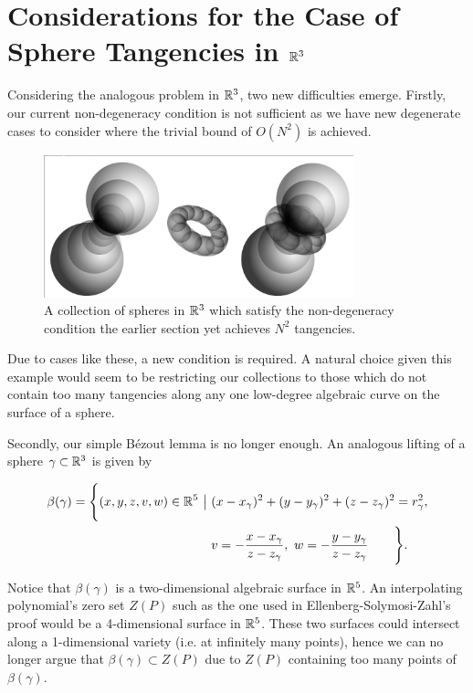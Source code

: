 \section[The Case of Sphere Tangencies in $\RR^{3}$]{Considerations for the Case of Sphere Tangencies in $\RR^{3}$}
Considering the analogous problem in $\RR^{3}$, two new difficulties emerge. 
Firstly, our current non-degeneracy condition is not sufficient as we have new degenerate cases to consider where the trivial bound of $O(N^2)$ is achieved. 
\begin{example}
    \begin{figure}[h]
        \centering 
        \includegraphics[width=0.8\textwidth]{images/degenr3.png}
        \caption{A collection of spheres in $\mathbb R^3$ which satisfy the non-degeneracy condition the earlier section yet achieves $N^2$ tangencies.}
        \end{figure}
\end{example}
Due to cases like these, a new condition is required. A natural choice given this example would seem to be restricting our collections to those which do not contain too many tangencies along any one low-degree algebraic curve on the surface of a sphere. 

Secondly, our simple Bézout lemma is no longer enough. An analogous lifting of a sphere $\gamma \subset \mathbb R^3$ is given by

\begin{align*}
    \beta(\gamma) = \Biggl \{ (x,y,z,v,w) \in \RR^5 \  \big | \ &(x-x_\gamma)^2 + (y-y_\gamma)^2 + (z-z_\gamma)^2 = r_\gamma^2, \\
     &v = - \frac{x-x_\gamma}{z-z_\gamma}, \ w = - \frac{y-y_\gamma}{z-z_\gamma} \qquad  \Biggr \} .
\end{align*}


Notice that $\beta(\gamma)$ is a two-dimensional algebraic surface in $\mathbb R^5$. An interpolating polynomial's zero set $Z(P)$ such as the one used in Ellenberg-Solymosi-Zahl's proof would be a 4-dimensional surface in $\mathbb R^5$.
These two surfaces could intersect along a 1-dimensional variety (i.e. at infinitely many points), hence we can no longer argue that $\beta(\gamma) \subset Z(P)$ due to $Z(P)$ containing too many points of $\beta(\gamma)$.

